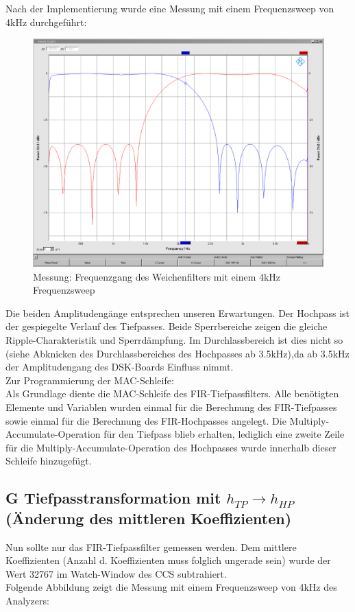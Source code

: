 \clearpage

\noindent Nach der Implementierung wurde eine Messung mit einem Frequenzsweep von 4kHz durchgeführt:

\begin{figure}[h]
	\centering
	\includegraphics[width=1\linewidth]{Bilder/Attachment_F_HPTP}
	\caption{Messung: Frequenzgang des Weichenfilters mit einem 4kHz Frequenzsweep}
	\label{fig:Attachment_F_HPTP}
\end{figure}

\noindent Die beiden Amplitudengänge entsprechen unseren Erwartungen. Der Hochpass ist der gespiegelte Verlauf des Tiefpasses. Beide Sperrbereiche zeigen die gleiche Ripple-Charakteristik und Sperrdämpfung.
Im Durchlassbereich ist dies nicht so (siehe Abknicken des Durchlassbereiches des Hochpasses ab 3.5kHz),da ab 3.5kHz der Amplitudengang des DSK-Boards Einfluss nimmt. \\
\noindent Zur Programmierung der MAC-Schleife: \\
\noindent Als Grundlage diente die MAC-Schleife des FIR-Tiefpassfilters. Alle benötigten Elemente und Variablen wurden einmal für die Berechnung des FIR-Tiefpasses sowie einmal für die Berechnung des FIR-Hochpasses angelegt. Die Multiply-Accumulate-Operation für den Tiefpass blieb erhalten, lediglich eine zweite Zeile für die Multiply-Accumulate-Operation des Hochpasses wurde innerhalb dieser Schleife hinzugefügt.

\clearpage

\subsection{G Tiefpasstransformation mit $h_{TP} \rightarrow h_{HP}$ (Änderung des mittleren Koeffizienten)}
\noindent Nun sollte nur das FIR-Tiefpassfilter gemessen werden. Dem mittlere Koeffizienten (Anzahl d. Koeffizienten muss folglich ungerade sein) wurde der Wert 32767 im Watch-Window des CCS subtrahiert.\\
Folgende Abbildung zeigt die Messung mit einem Frequenzsweep von 4kHz des Analyzers:\\

